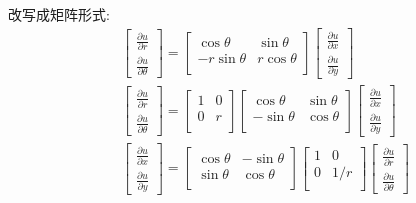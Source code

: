 \begin{frame}
	改写成矩阵形式:
	\[ 
\begin{aligned}
	&\begin{bmatrix}
	   \frac{\partial u}{\partial r} \\
	   \frac{\partial u}{\partial \theta} 
	\end{bmatrix}
	=
	\begin{bmatrix}
		\cos \theta &  \sin \theta \\
		-r \sin \theta& r\cos \theta \\  
	\end{bmatrix}
	\begin{bmatrix}
		\frac{\partial u}{\partial x} \\
		\frac{\partial u}{\partial y} 
	 \end{bmatrix}\\
	&\begin{bmatrix}
		\frac{\partial u}{\partial r} \\
		\frac{\partial u}{\partial \theta} 
	 \end{bmatrix}
	 =
	 \begin{bmatrix}
		1 &  0 \\
		0 & r \\  
	\end{bmatrix}
	 \begin{bmatrix}
		 \cos \theta &  \sin \theta \\
		 -\sin \theta& \cos \theta \\  
	 \end{bmatrix}
	 \begin{bmatrix}
		 \frac{\partial u}{\partial x} \\
		 \frac{\partial u}{\partial y} 
	  \end{bmatrix}\\
	 &\begin{bmatrix}
		\frac{\partial u}{\partial x} \\
		\frac{\partial u}{\partial y} 
	 \end{bmatrix}
	 =
	 \begin{bmatrix}
		 \cos \theta &  -\sin \theta \\
		 \sin \theta& \cos \theta \\  
	 \end{bmatrix}
	 \begin{bmatrix}
		1 &  0 \\
		0 & 1/r \\  
	\end{bmatrix}
	 \begin{bmatrix}
		 \frac{\partial u}{\partial r} \\
		 \frac{\partial u}{\partial \theta} 
	  \end{bmatrix}\\
\end{aligned}
	  \]
\end{frame}



